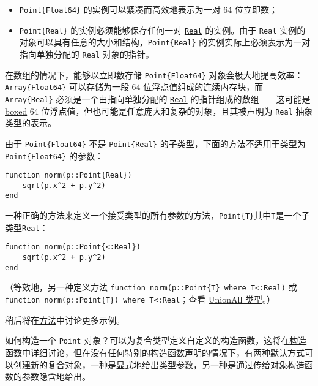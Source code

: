\begin{itemize}
\item \texttt{Point\{Float64\}} 的实例可以紧凑而高效地表示为一对 64 位立即数；


\item \texttt{Point\{Real\}} 的实例必须能够保存任何一对 \hyperlink{6175959395021454412}{\texttt{Real}} 的实例。由于 \texttt{Real} 实例的对象可以具有任意的大小和结构，\texttt{Point\{Real\}} 的实例实际上必须表示为一对指向单独分配的 \texttt{Real} 对象的指针。

\end{itemize}


在数组的情况下，能够以立即数存储 \texttt{Point\{Float64\}} 对象会极大地提高效率：\texttt{Array\{Float64\}} 可以存储为一段 64 位浮点值组成的连续内存块，而 \texttt{Array\{Real\}} 必须是一个由指向单独分配的 \hyperlink{6175959395021454412}{\texttt{Real}} 的指针组成的数组——这可能是 \href{https://en.wikipedia.org/wiki/Object\_type\_\%28object-oriented\_programming\%29\#Boxing}{boxed} 64 位浮点值，但也可能是任意庞大和复杂的对象，且其被声明为 \texttt{Real} 抽象类型的表示。



由于 \texttt{Point\{Float64\}} 不是 \texttt{Point\{Real\}} 的子类型，下面的方法不适用于类型为 \texttt{Point\{Float64\}} 的参数：




\begin{verbatim}
function norm(p::Point{Real})
    sqrt(p.x^2 + p.y^2)
end
\end{verbatim}



一种正确的方法来定义一个接受类型的所有参数的方法，\texttt{Point\{T\}}其中\texttt{T}是一个子类型\hyperlink{6175959395021454412}{\texttt{Real}}：




\begin{verbatim}
function norm(p::Point{<:Real})
    sqrt(p.x^2 + p.y^2)
end
\end{verbatim}



（等效地，另一种定义方法 \texttt{function norm(p::Point\{T\} where T<:Real)} 或 \texttt{function norm(p::Point\{T\}) where T<:Real}；查看 \hyperlink{11072845175692859046}{UnionAll 类型}。）



稍后将在\hyperlink{3842379394166369470}{方法}中讨论更多示例。



如何构造一个 \texttt{Point} 对象？可以为复合类型定义自定义的构造函数，这将在\hyperlink{1489967485005487723}{构造函数}中详细讨论，但在没有任何特别的构造函数声明的情况下，有两种默认方式可以创建新的复合对象，一种是显式地给出类型参数，另一种是通过传给对象构造函数的参数隐含地给出。




